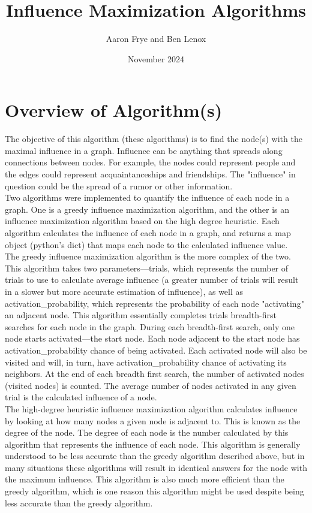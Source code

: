 \documentclass{article}
\title{Influence Maximization Algorithms}
\author{Aaron Frye and Ben Lenox}
\date{November 2024}
\begin{document}

\maketitle

\section{Overview of Algorithm(s)}

The objective of this algorithm (these algorithms) is to find the node(s) with the maximal influence in a graph.  Influence can be anything that spreads along connections between nodes.  For example, the nodes could represent people and the edges could represent acquaintanceships and friendships.  The "influence" in question could be the spread of a rumor or other information. \\

Two algorithms were implemented to quantify the influence of each node in a graph.  One is a greedy influence maximization algorithm, and the other is an influence maximization algorithm based on the high degree heuristic.  Each algorithm calculates the influence of each node in a graph, and returns a map object (python's dict) that maps each node to the calculated influence value. \\

The greedy influence maximization algorithm is the more complex of the two.  This algorithm takes two parameters---trials, which represents the number of trials to use to calculate average influence (a greater number of trials will result in a slower but more accurate estimation of influence), as well as activation\_probability, which represents the probability of each node "activating" an adjacent node.  This algorithm essentially completes trials breadth-first searches for each node in the graph.  During each breadth-first search, only one node starts activated---the start node.  Each node adjacent to the start node has activation\_probability chance of being activated.  Each activated node will also be visited and will, in turn, have activation\_probability chance of activating its neighbors.  At the end of each breadth first search, the number of activated nodes (visited nodes) is counted.  The average number of nodes activated in any given trial is the calculated influence of a node. \\

The high-degree heuristic influence maximization algorithm calculates influence by looking at how many nodes a given node is adjacent to.  This is known as the degree of the node.  The degree of each node is the number calculated by this algorithm that represents the influence of each node.  This algorithm is generally understood to be less accurate than the greedy algorithm described above, but in many situations these algorithms will result in identical answers for the node with the maximum influence.  This algorithm is also much more efficient than the greedy algorithm, which is one reason this algorithm might be used despite being less accurate than the greedy algorithm.
\end{document}
